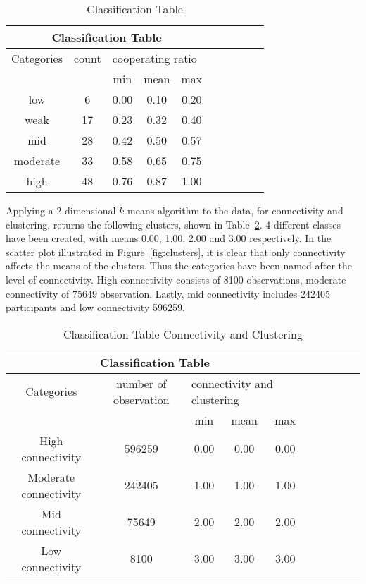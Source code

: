 \begin{table}[H]
	\centering
	\begin{adjustbox}{width=0.4\textwidth}
		\small
		\begin{tabular}{cccccccccc}
				\toprule
			\multicolumn{5}{|c|}{Classification Table}                        \\ \hline
			Categories & count & \multicolumn{3}{l|}{cooperating ratio}        \\ \hline
			         &    & min  & mean & max  \\ \hline
			low      & 6  & 0.00 & 0.10 & 0.20 \\ \hline
			weak     & 17 & 0.23 & 0.32 & 0.40 \\ \hline
			mid      & 28 & 0.42 & 0.50 & 0.57 \\ \hline
			moderate & 33 & 0.58 & 0.65 & 0.75 \\ \hline
			high     & 48 & 0.76 & 0.87 & 1.00 \\ \bottomrule
		\end{tabular}
	\end{adjustbox}
	\caption{Classification Table}
	\label{table:class}
\end{table}

Applying a 2 dimensional \(k\)-means algorithm to the data, for connectivity and
clustering, returns the following clusters, shown in Table~\ref{table:clusters}.
4 different classes have been created, with means 0.00, 1.00, 2.00 and 3.00 respectively.
In the scatter plot illustrated in Figure~\ref{fig:clusters}, it is clear that only connectivity
affects the means of the clusters. Thus the categories have been named after
the level of connectivity. High connectivity consists of 8100 observations,
moderate connectivity of 75649 observation. Lastly, mid connectivity includes
242405 participants and low connectivity 596259.

\begin{table}[!hbtp]
	\centering
	\begin{adjustbox}{width=0.7\textwidth}
		\small
		\begin{tabular}{cccccccccc}
				\toprule
			\multicolumn{5}{|c|}{Classification Table} \\ \hline
			Categories & number of observation & \multicolumn{3}{l|}{connectivity and clustering} \\ \hline
			                      &        & min  & mean & max  \\ \hline
			High connectivity     & 596259 & 0.00 & 0.00 & 0.00 \\ \hline
			Moderate connectivity & 242405 & 1.00 & 1.00 & 1.00 \\ \hline
			Mid connectivity      & 75649  & 2.00 & 2.00 & 2.00 \\ \hline
			Low connectivity      & 8100   & 3.00 & 3.00 & 3.00 \\ \bottomrule
		\end{tabular}
	\end{adjustbox}
	\caption{Classification Table Connectivity and Clustering}
	\label{table:clusters}
\end{table}

